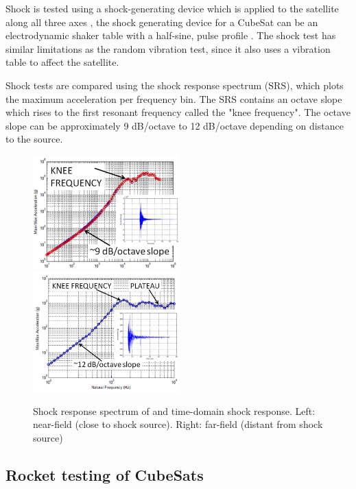\documentclass[a4paper,11pt]{article}
\begin{document}
Shock is tested using a shock-generating device which is applied to the satellite along all three axes \cite{nasa-gevs,nasa-pyroshock}, the shock generating device for a CubeSat can be an electrodynamic shaker table \cite{nieto2019cubesat} with a half-sine, pulse profile \cite{nieto2019cubesat}. The shock test has similar limitations as the random vibration test, since it also uses a vibration table to affect the satellite.

Shock tests are compared using the shock response spectrum (SRS), which plots the maximum acceleration per frequency bin. The SRS contains an octave slope which rises to the first resonant frequency called the "knee frequency". The octave slope can be approximately 9 dB/octave to 12 dB/octave depending on distance to the source.

\begin{figure}[H]
  \includegraphics[width=0.5\textwidth]{images/pyroshock2.png}
  \includegraphics[width=0.5\textwidth]{images/pyroshock1.png}
  \caption{Shock response spectrum of and time-domain shock response. Left: near-field (close to shock source). Right: far-field (distant from shock source) \cite{nasa-pyroshock}}
  \label{fig:pyroshock}
\end{figure}


\subsection{Rocket testing of CubeSats}
\end{document}
